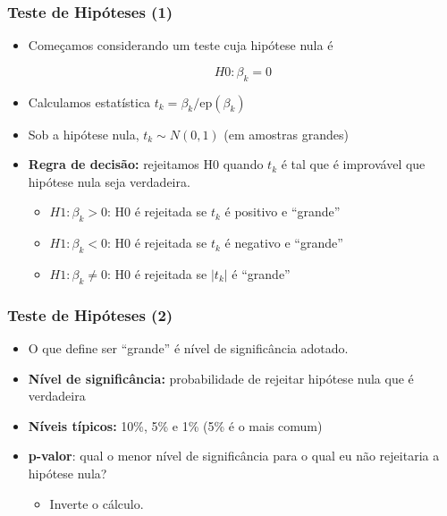 \documentclass[10pt,slides,xcolor=pdftex,dvipsnames,table]{beamer}
\begin{document}

\begin{frame}[fragile]
	\frametitle{Teste de Hipóteses (1)}

\begin{itemize}\itemsep1.2em

\item Começamos considerando um teste cuja hipótese nula é 

$$H0: \beta_k = 0$$

\item Calculamos estatística $t_k = \beta_k/\text{ep} \left(\beta_k\right)$

\item Sob a hipótese nula, $t_k \sim N(0,1)$ (em amostras grandes)

\item \textbf{Regra de decisão:} rejeitamos H0 quando $t_k$ é tal que é improvável que hipótese nula seja verdadeira.
\begin{itemize}
\item $H1: \beta_k > 0$: H0 é rejeitada se $t_k$ é positivo e ``grande''
\item $H1: \beta_k < 0$: H0 é rejeitada se $t_k$ é negativo e ``grande''
\item $H1: \beta_k \neq 0$: H0 é rejeitada se $|t_k|$ é ``grande''
\end{itemize}     

\end{itemize}

\end{frame}


\begin{frame}[fragile]
	\frametitle{Teste de Hipóteses (2)}

\begin{itemize}\itemsep1.2em

\item O que define ser ``grande'' é nível de significância adotado.

\item \textbf{Nível de significância:} probabilidade de rejeitar hipótese nula que é verdadeira

\item \textbf{Níveis típicos:} 10\%, 5\% e 1\% (5\% é o mais comum)

\item \textbf{p-valor}: qual o menor nível de significância para o qual eu não rejeitaria a hipótese nula?
\begin{itemize}
\item Inverte o cálculo.
\end{itemize}      

\end{itemize}

\end{frame}
\end{document}
